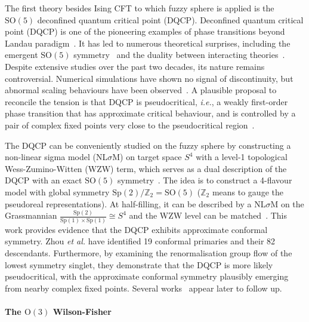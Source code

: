 \documentclass{timesjhep}
\begin{document}
The first theory besides Ising CFT to which fuzzy sphere is applied is the $\mathrm{SO}(5)$ deconfined quantum critical point (DQCP). Deconfined quantum critical point (DQCP) is one of the pioneering examples of phase transitions beyond Landau paradigm~\cite{Senthil2003DQCP,Senthil2004DQCP,Senthil2023DQCP}. It has led to numerous theoretical surprises, including the emergent $\mathrm{SO}(5)$ symmetry~\cite{Nahum2015DQCP} and the duality between interacting theories~\cite{Wang2017DQCP}. Despite extensive studies over the past two decades, its nature remains controversial. Numerical simulations have shown no signal of discontinuity, but abnormal scaling behaviours have been observed~\cite{Senthil2023DQCP}. A plausible proposal to reconcile the tension is that DQCP is pseudocritical, \textit{i.e.}, a weakly first-order phase transition that has approximate critical behaviour, and is controlled by a pair of complex fixed points very close to the pseudocritical region~\cite{Wang2017DQCP,Gorbenko2018Complex}. 

The DQCP can be conveniently studied on the fuzzy sphere by constructing a non-linear sigma model (NL$\sigma$M) on target space $S^4$ with a level-1 topological Wess-Zumino-Witten (WZW) term, which serves as a dual description of the DQCP with an exact $\mathrm{SO}(5)$ symmetry~\cite{Nahum2015DQCP,Wang2017DQCP}. The idea is to construct a 4-flavour model with global symmetry $\mathrm{Sp}(2)/\mathbb{Z}_2=\mathrm{SO}(5)$ ($\mathbb{Z}_2$ means to gauge the pseudoreal representations). At half-filling, it can be described by a NL$\sigma$M on the Grassmannian $\tfrac{\mathrm{Sp}(2)}{\mathrm{Sp}(1)\times\mathrm{Sp}(1)}\cong S^4$ and the WZW level can be matched~\cite{Ippoliti2018DQCP,Wang2020DQCP}. This work provides evidence that the DQCP exhibits approximate conformal symmetry. Zhou \textit{et al.} have identified 19 conformal primaries and their 82 descendants. Furthermore, by examining the renormalisation group flow of the lowest symmetry singlet, they demonstrate that the DQCP is more likely pseudocritical, with the approximate conformal symmetry plausibly emerging from nearby complex fixed points. Several works~\cite{Chen2023WZW,Chen2024WZW} appear later to follow up.

\paragraph{The $\mathrm{O}(3)$ Wilson-Fisher~\cite{Han2023Dec}}
\end{document}
